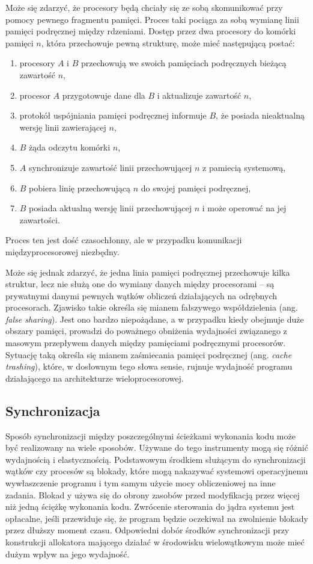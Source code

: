 \documentclass[12pt,a4paper,titlepage,twoside]{mwart}
\begin{document}
Może się zdarzyć, że procesory będą chciały się ze sobą skomunikować przy
pomocy pewnego fragmentu pamięci. Proces taki pociąga za sobą wymianę linii
pamięci podręcznej między rdzeniami. Dostęp przez dwa procesory do komórki
pamięci $n$, która przechowuje pewną strukturę, może mieć następującą postać:

\begin{enumerate}
\item procesory $A$ i $B$ przechowują we swoich pamięciach podręcznych
bieżącą zawartość $n$,
\item procesor $A$ przygotowuje dane dla $B$ i aktualizuje zawartość $n$,
\item protokół uspójniania pamięci podręcznej informuje $B$, że posiada
nieaktualną wersję linii zawierającej $n$,
\item $B$ żąda odczytu komórki $n$,
\item $A$ synchronizuje zawartość linii przechowującej $n$ z pamiecią
systemową,
\item $B$ pobiera linię przechowującą $n$ do swojej pamięci podręcznej,
\item $B$ posiada aktualną wersję linii przechowującej $n$ i może operować na
jej zawartości.
\end{enumerate}

Proces ten jest dość czasochłonny, ale w przypadku komunikacji
międzyprocesorowej niezbędny.

Może się jednak zdarzyć, że jedna linia pamięci podręcznej przechowuje kilka
struktur, lecz nie służą one do wymiany danych między procesorami -- są
prywatnymi danymi pewnych wątków obliczeń działających na odrębnych procesorach.
Zjawisko takie określa się mianem fałszywego współdzielenia (ang. \textit{false
sharing}). Jest ono bardzo niepożądane, a w przypadku kiedy obejmuje duże
obszary pamięci, prowadzi do poważnego obniżenia wydajności związanego z
masowym przepływem danych między pamięciami podręcznymi procesorów. Sytuację
taką określa się mianem zaśmiecania pamięci podręcznej (ang. \textit{cache
trashing}), które, w dosłownym tego słowa sensie, rujnuje wydajność programu
działającego na architekturze wieloprocesorowej.

\subsection{Synchronizacja}

Sposób synchronizacji między poszczególnymi ścieżkami wykonania kodu może być
realizowany na wiele sposobów. Używane do tego instrumenty mogą się różnić
wydajnością i elastycznością. Podstawowym środkiem służącym do synchronizacji
wątków czy procesów są blokady, które mogą nakazywać systemowi operacyjnemu
wywłaszczenie programu i tym samym użycie mocy obliczeniowej na inne zadania.
Blokad y używa się do obrony zasobów przed modyfikacją przez więcej niż jedną
ściężkę wykonania kodu. Zwrócenie sterowania do jądra systemu jest opłacalne,
jeśli przewiduje się, że program będzie oczekiwał na zwolnienie blokady przez
dłuższy moment czasu. Odpowiedni dobór środków synchronizacji przy konstrukcji
allokatora mającego działać w środowisku wielowątkowym może mieć dużym wpływ na
jego wydajność.
\end{document}
